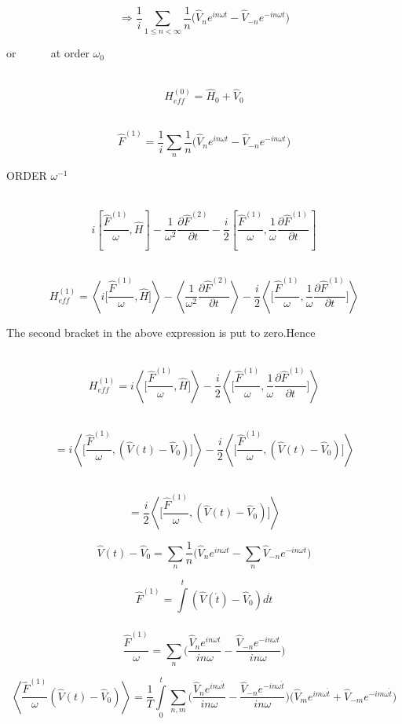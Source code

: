 ~~~~~~~$$\Rightarrow \frac{1}{i}\displaystyle\sum_{1\leq n<\infty}\frac{1}{n}\biggl(\hat{V}_{n}e^{in\omega t} -\hat{V}_{-n}e^{-in\omega t}\biggr)$$

or ~~~~~ at order $\omega_0$

~~~~~~~~~$$H_{eff}^{(0)} = \hat{H}_{0} + \hat{V}_0 $$

~~~~~~~~~$$\hat{F}^{(1)} = \frac{1}{i}\displaystyle\sum_{n}\frac{1}{n}\biggl(\hat{V}_{n}e^{in\omega t} -\hat{V}_{-n}e^{-in\omega t}\biggr)$$

ORDER $\omega^{-1}$

~~~~~~~~~$$i\left[\frac{\hat{F}^{(1)}}{\omega},\hat{H}\right]- \frac{1}{\omega^2}\frac{\partial\hat{F}^{(2)}}{\partial t}
 - \frac{i}{2}\left[\frac{\hat{F}^{(1)}}{\omega},\frac{1}{\omega}\frac{\partial \hat{F}^{(1)}}{\partial t}\right]$$
 
~~~~~~~~~$$H_{eff}^{(1)} = \left\langle i\biggl[\frac{\hat{F}^{(1)}}{\omega},\hat{H}\biggr]\right\rangle-\left\langle\frac{1}{\omega^2}\frac{\partial\hat{F}^{(2)}}{\partial t}\right\rangle
- \frac{i}{2}\left\langle\biggl[\frac{\hat{F}^{(1)}}{\omega},\frac{1}{\omega}\frac{\partial \hat{F}^{(1)}}{\partial t}\biggr]\right\rangle$$

The second bracket in the above expression is put to zero.Hence

~~~~~~~~~$$H_{eff}^{(1)} = i\left\langle \biggl[\frac{\hat{F}^{(1)}}{\omega},\hat{H}\biggr]\right\rangle- \frac{i}{2}\left\langle\biggl[\frac{\hat{F}^{(1)}}{\omega},\frac{1}{\omega}\frac{\partial \hat{F}^{(1)}}{\partial t}\biggr]\right\rangle$$

~~~~~~~~~~~$$= i\left\langle \biggl[\frac{\hat{F}^{(1)}}{\omega},(\hat{V}(t)-\hat{V}_0)\biggr]\right\rangle -\frac{i}{2}\left\langle\biggl[\frac{\hat{F}^{(1)}}{\omega},(\hat{V}(t)-\hat{V}_0)\biggr]\right\rangle$$

~~~~~~~~~~~$$=\frac{i}{2}\left\langle\biggl[\frac{\hat{F}^{(1)}}{\omega},(\hat{V}(t)-\hat{V}_0)\biggr]\right\rangle$$

$$\hat{V}(t)-\hat{V}_0 = \displaystyle\sum_{n}\frac{1}{n}\biggl(\hat{V}_{n}e^{in\omega t} -\displaystyle\sum_{n}\hat{V}_{-n}e^{-in\omega t}\biggr)$$

$$ \hat{F}^{(1)} = \int\limits_{}^{t}(\hat{V}(\acute{t})-\hat{V}_0)d\acute{t}$$

$$ \frac{\hat{F}^{(1)}}{\omega} = \displaystyle\sum_{n}\biggl(\frac{\hat{V}_{n}e^{in\omega t}}{in\omega}-\frac{\hat{V}_{-n}e^{-in\omega t}}{in\omega}\biggr)$$

$$ \left\langle \frac{\hat{F}^{(1)}}{\omega}(\hat{V}(t)-\hat{V}_{0})\right\rangle = \frac{1}{T}\int\limits_{0}^{t}\displaystyle\sum_{n,m}\biggl(\frac{\hat{V}_{n}e^{in\omega\acute{t}}}{in\omega}-\frac{\hat{V}_{-n}e^{-in\omega\acute{t}}}{in\omega}\biggr)
\biggl(\hat{V}_{m}e^{im\omega\acute{t}}+\hat{V}_{-m}e^{-im\omega\acute{t}}\biggr)$$

